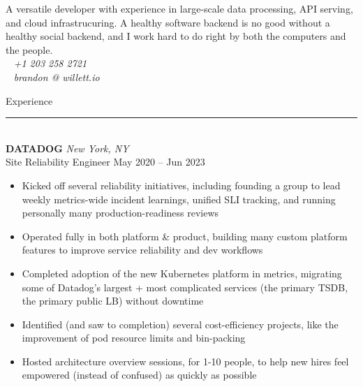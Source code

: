 \documentclass[letterpaper]{article}
\begin{document}
	\begin{bgbox}[height=\paperheight, colback=white, width=0.62\textwidth]\raggedright
		\vspace*{9pt}
		\begin{bgbox}[height=1.60in, colback=gray!15, width=\textwidth, top=0.05in]\raggedright
			A versatile developer with experience in large-scale data processing, API serving, and cloud infrastrucuring. A healthy software backend is no good without a healthy social backend, and I work hard to do right by both the computers and the people. \\[-16pt]
			\null \hfill {\large\Telefon}~ \textit{+1 203 258 2721} \\[-16pt]
			\null \hfill {\large\Letter}~ \textit{brandon @ willett.io }
		\end{bgbox}\vspace*{25.5pt}
		{\Huge{Experience}}\\[-6pt]
		\noindent\rule{\textwidth}{1pt}\\[12pt]
		\textbf{DATADOG} \hfill \textit{New York, NY}\\
		Site Reliability Engineer \hfill May 2020 -- Jun 2023
		\begin{itemize} [noitemsep,topsep=4pt]
			\item Kicked off several reliability initiatives, including founding a group to lead weekly metrics-wide incident learnings, unified SLI tracking, and running personally many production-readiness reviews
			\item Operated fully in both platform \& product, building many custom platform features to improve service reliability and dev workflows
			\item Completed adoption of the new Kubernetes platform in metrics, migrating some of Datadog's largest + most complicated services (the primary TSDB, the primary public LB) without downtime
			\item Identified (and saw to completion) several cost-efficiency projects, like the improvement of pod resource limits and bin-packing
			\item Hosted architecture overview sessions, for 1-10 people, to help new hires feel empowered (instead of confused) as quickly as possible

\end{itemize}
\end{bgbox}
\end{document}
